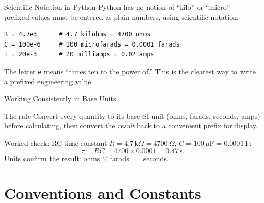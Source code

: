 \documentclass[9pt,aspectratio=169,xcolor=table]{beamer}
\begin{document}
\begin{frame}[fragile]{Scientific Notation in Python}
    \leavevmode
    Python has no notion of ``kilo'' or ``micro'' --- prefixed values
    must be entered as plain numbers, using \alert{scientific notation}.

\begin{lstlisting}
R = 4.7e3      # 4.7 kilohms = 4700 ohms
C = 100e-6     # 100 microfarads = 0.0001 farads
I = 20e-3      # 20 milliamps = 0.02 amps
\end{lstlisting}

    \vspace{2mm}
    {\small The letter \texttt{e} means ``times ten to the power of.''
    This is the clearest way to write a prefixed engineering value.}
\end{frame}

\begin{frame}{Working Consistently in Base Units}
    \leavevmode
    \begin{block}{The rule}
        Convert every quantity to its \alert{base SI unit} (ohms, farads,
        seconds, amps) before calculating, then convert the \emph{result}
        back to a convenient prefix for display.
    \end{block}

    \vspace{3mm}
    \begin{alertblock}{Worked check: RC time constant}
        $R = 4.7\,\text{k}\Omega = 4700\,\Omega$, $C = 100\,\mu\text{F} =
        0.0001\,\text{F}$:
        \[
        \tau = RC = 4700 \times 0.0001 = 0.47\,\text{s}.
        \]
        Units confirm the result: ohms $\times$ farads $=$ seconds.
    \end{alertblock}
\end{frame}

\section{Conventions and Constants}
\end{document}
